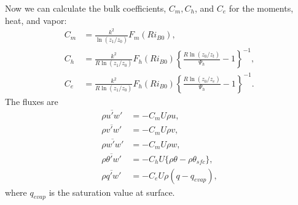 Now we can calculate the bulk coefficients, $C_m, C_h$, and $C_e$ for the moments, heat, and vapor:
\begin{align}
  C_m &= \frac{k^2}{\ln(z_1/z_0)}F_m(Ri_{B0}), \\
  C_h &= \frac{k^2}{R\ln(z_1/z_0)}F_h(Ri_{B0})\left\{\frac{R\ln(z_0/z_t)}{\Psi_h}-1\right\}^{-1}, \\
  C_e &= \frac{k^2}{R\ln(z_1/z_0)}F_h(Ri_{B0})\left\{\frac{R\ln(z_0/z_e)}{\Psi_h}-1\right\}^{-1}.
\end{align}
The fluxes are
\begin{align}
  \overline{\rho u'w'} &= - C_m U \rho u, \\
  \overline{\rho v'w'} &= - C_m U \rho v, \\
  \overline{\rho w'w'} &= - C_m U \rho w, \\
  \overline{\rho \theta'w'} &= - C_h U \{\rho \theta - \rho \theta_{sfc}\}, \\
  \overline{\rho q'w'} &= -C_e U \rho ( q - q_{evap} ),
\end{align}
where $q_{evap}$ is the saturation value at surface.

